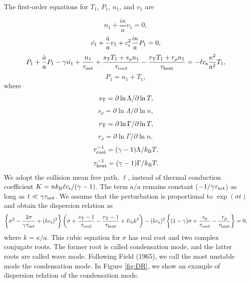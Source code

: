 The first-order equations for $T_1$, $P_1$, $n_1$, and $v_1$ are 

\begin{equation}
\dot{n_1}+\frac{i\kappa}{a}v_1=0,
\end{equation}
\begin{equation}
\dot{v_1}+\frac{\dot{a}}{a}v_1+c_{\rm s}^2\frac{i\kappa}{a}P_1=0,
\end{equation}
\begin{equation}
\dot{P_1}+\frac{\dot{a}}{a}P_1-\gamma\dot{n_1}+\frac{n_1}{\tau_{\rm net}}
+
\frac{s_{\rm T}T_1+s_{\rho}n_1}{\tau_{\rm cool}}-
\frac{r_{\rm T}T_1+r_{\rho}n_1}{\tau_{\rm heat}}
=-\ell c_{\rm s}\frac{\kappa^2}{a^2}T_1,
\end{equation}
\begin{equation}
P_1=n_1+T_1,
\end{equation}
where
\begin{equation}s_{\rm T}=\partial \ln \Lambda/\partial \ln T,\end{equation}
\begin{equation}s_{\rho} =\partial \ln \Lambda/\partial \ln n,\end{equation}
\begin{equation}r_{\rm T}=\partial \ln \Gamma/\partial \ln T,\end{equation}
\begin{equation}r_{\rho}=\partial \ln \Gamma/\partial \ln n,\end{equation}
\begin{equation}\tau_{\rm cool}^{-1}=(\gamma-1)\Lambda/k_{\rm B}T,\end{equation}
\begin{equation}\tau_{\rm heat}^{-1}=(\gamma-1)\Gamma/k_{\rm B}T.\end{equation}
We adopt the collision mean free path, $\ell$, instead of 
thermal conduction coefficient $K=nk_{\rm B}\ell c_{\rm s}/(\gamma-1)$. 
The term $\dot{a}/a$ remains constant ($-1/\gamma \tau_{\rm net}$)  
as long as $t\ll \gamma\tau_{\rm net}$.
We assume that the perturbation is proportional to $\exp(\sigma t)$
and obtain the dispersion relation as
\begin{equation}
\left\{\sigma^2-\frac{2\sigma}{\gamma\tau_{\rm net}}+(k c_{\rm s})^2\right\}
\left(\sigma
+\frac{s_{\rm T}-1}{\tau_{\rm cool}}
-\frac{r_{\rm T}-1}{\tau_{\rm heat}}+\ell c_{\rm s} k^2\right)
-(k c_{\rm s})^2\left\{(1-\gamma)\sigma+\frac{s_{\rho}}{\tau_{\rm cool}}
-\frac{r_{\rho}}{\tau_{\rm heat}}\right\}=0,
\label{eq:DR}
\end{equation} 
where $k=\kappa/a$.
This cubic equation for $\sigma$
has real root and two complex conjugate roots.  
The former root is called condensation mode, 
and the latter roots are called wave mode.
Following Field (1965), we call the most unstable mode
the condensation mode.
In Figure \ref{fig:DR},
we show an example of dispersion relation of the condensation mode.

